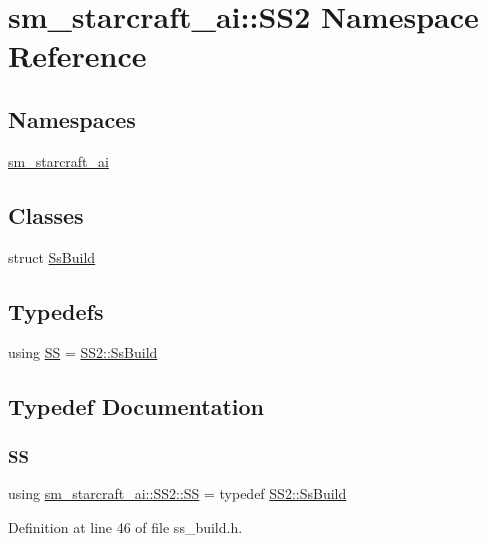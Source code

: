 \hypertarget{namespacesm__starcraft__ai_1_1SS2}{}\section{sm\+\_\+starcraft\+\_\+ai\+:\+:S\+S2 Namespace Reference}
\label{namespacesm__starcraft__ai_1_1SS2}
\subsection*{Namespaces}
\begin{DoxyCompactItemize}
\item 
 \hyperlink{namespacesm__starcraft__ai_1_1SS2_1_1sm__starcraft__ai}{sm\+\_\+starcraft\+\_\+ai}
\end{DoxyCompactItemize}
\subsection*{Classes}
\begin{DoxyCompactItemize}
\item 
struct \hyperlink{structsm__starcraft__ai_1_1SS2_1_1SsBuild}{Ss\+Build}
\end{DoxyCompactItemize}
\subsection*{Typedefs}
\begin{DoxyCompactItemize}
\item 
using \hyperlink{namespacesm__starcraft__ai_1_1SS2_ac575e5abdae90f9041a4178c966237f6}{SS} = \hyperlink{structsm__starcraft__ai_1_1SS2_1_1SsBuild}{S\+S2\+::\+Ss\+Build}
\end{DoxyCompactItemize}


\subsection{Typedef Documentation}
\mbox{\label{namespacesm__starcraft__ai_1_1SS2_ac575e5abdae90f9041a4178c966237f6}} 
\subsubsection{\texorpdfstring{SS}{SS}}
{\footnotesize\ttfamily using \hyperlink{namespacesm__starcraft__ai_1_1SS2_ac575e5abdae90f9041a4178c966237f6}{sm\+\_\+starcraft\+\_\+ai\+::\+S\+S2\+::\+SS} = typedef \hyperlink{structsm__starcraft__ai_1_1SS2_1_1SsBuild}{S\+S2\+::\+Ss\+Build}}



Definition at line 46 of file ss\+\_\+build.\+h.


